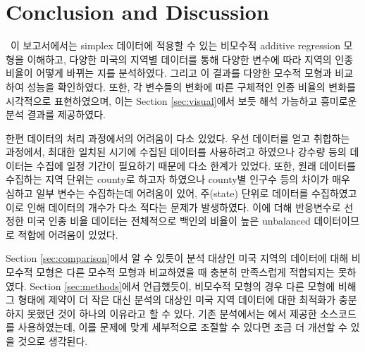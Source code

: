 \section{Conclusion and Discussion}\label{sec:conclusion}

\ \quad 이 보고서에서는 simplex 데이터에 적용할 수 있는 비모수적 additive regression 모형을 이해하고, 다양한 미국의 지역별 데이터를 통해 다양한 변수에 따라 지역의 인종 비율이 어떻게 바뀌는 지를 분석하였다. 그리고 이 결과를 다양한 모수적 모형과 비교하여 성능을 확인하였다. 또한, 각 변수들의 변화에 따른 구체적인 인종 비율의 변화를 시각적으로 표현하였으며, 이는 Section \ref{sec:visual}에서 보듯 해석 가능하고 흥미로운 분석 결과를 제공하였다.

한편 데이터의 처리 과정에서의 어려움이 다소 있었다. 우선 데이터를 얻고 취합하는 과정에서, 최대한 일치된 시기에 수집된 데이터를 사용하려고 하였으나 강수량 등의 데이터는 수집에 일정 기간이 필요하기 때문에 다소 한계가 있었다. 또한, 원래 데이터를 수집하는 지역 단위는 county로 하고자 하였으나 county별 인구수 등의 차이가 매우 심하고 일부 변수는 수집하는데 어려움이 있어, 주(state) 단위로 데이터를 수집하였고 이로 인해 데이터의 개수가 다소 적다는 문제가 발생하였다. 이에 더해 반응변수로 선정한 미국 인종 비율 데이터는 전체적으로 백인의 비율이 높은 unbalanced 데이터이므로 적합에 어려움이 있었다.

Section \ref{sec:comparison}에서 알 수 있듯이 분석 대상인 미국 지역의 데이터에 대해 비모수적 모형은 다른 모수적 모형과 비교하였을 때 충분히 만족스럽게 적합되지는 못하였다. Section \ref{sec:methods}에서 언급했듯이, 비모수적 모형의 경우 다른 모형에 비해 그 형태에 제약이 더 작은 대신 분석의 대상인 미국 지역 데이터에 대한 최적화가 충분하지 못했던 것이 하나의 이유라고 할 수 있다. 기존 분석에서는  \citet{jeon2018additive}에서 제공한 소스코드를 사용하였는데, 이를 문제에 맞게 세부적으로 조절할 수 있다면 조금 더 개선할 수 있을 것으로 생각된다. 
